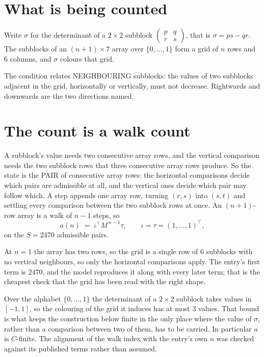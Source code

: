 \documentclass[11pt,a4paper]{article}
\theoremstyle{plain}
\theoremstyle{definition}
\begin{document}
\section{What is being counted}

Write $\sigma$ for the determinant of a $2\times2$ subblock
$\begin{pmatrix}p&q\\r&s\end{pmatrix}$, that is $\sigma=ps-qr$. The subblocks of an
$(n+1)\times7$ array over $\{0,\dots,1\}$ form a grid of $n$ rows and $6$
columns, and $\sigma$ colours that grid.

The condition relates NEIGHBOURING subblocks: the values of two subblocks adjacent in the grid,
horizontally or vertically, must not decrease. Rightwards and downwards are the two directions named.

\section{The count is a walk count}

A subblock's value needs two consecutive array rows, and the vertical
comparison needs the two subblock rows that three consecutive array rows produce. So the state
is the PAIR of consecutive array rows: the horizontal comparisons decide which pairs are
admissible at all, and the vertical ones decide which pair may follow which. A step appends one
array row, turning $(r,s)$ into $(s,t)$ and settling every comparison between the two subblock
rows at once. An $(n+1)$-row array is a walk of $n-1$ steps, so
\[
a(n)\;=\;\iota^{\!\top}M^{\,n-1}\tau,\qquad\iota=\tau=(1,\dots,1)^{\!\top},
\]
on the $S=2470$ admissible pairs.

At $n=1$ the array has two rows, so the grid is a single row of $6$
subblocks with no vertical neighbours, so only the horizontal comparisons apply. The
entry's first term is $2470$, and the model reproduces it along with every later term; that
is the cheapest check that the grid has been read with the right shape.

Over the alphabet $\{0,\dots,1\}$ the determinant of a $2\times2$ subblock takes values in
$[-1,1]$, so the colouring of the grid it induces has at most $3$ values.
That bound is what keeps the construction below finite in the only place where the value of
$\sigma$, rather than a comparison between two of them, has to be carried.
In particular $a$ is $C$-finite. The alignment of the walk index with the entry's own $n$ was
checked against its published terms rather than assumed.
\end{document}
